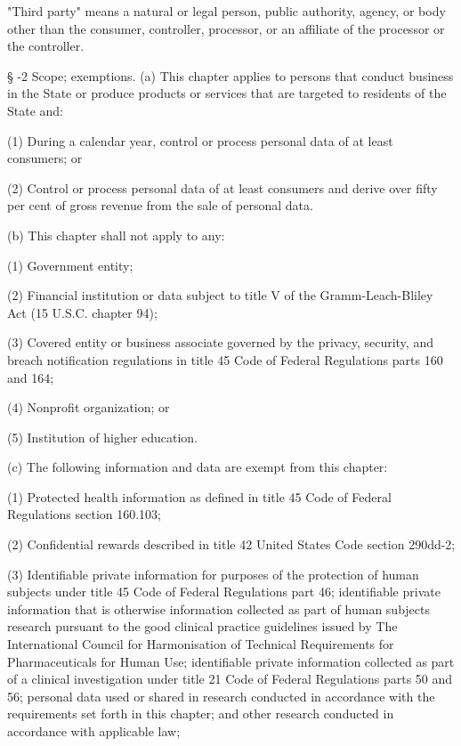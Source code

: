      "Third party" means a natural or legal person, public authority, agency, or body other than the consumer, controller, processor, or an affiliate of the processor or the controller.

     §   -2  Scope; exemptions.  (a)  This chapter applies to persons that conduct business in the State or produce products or services that are targeted to residents of the State and:

     (1)  During a calendar year, control or process personal data of at least               consumers; or

     (2)  Control or process personal data of at least               consumers and derive over fifty per cent of gross revenue from the sale of personal data.

     (b)  This chapter shall not apply to any:

     (1)  Government entity;

     (2)  Financial institution or data subject to title V of the Gramm-Leach-Bliley Act (15 U.S.C. chapter 94);

     (3)  Covered entity or business associate governed by the privacy, security, and breach notification regulations in title 45 Code of Federal Regulations parts 160 and 164;

     (4)  Nonprofit organization; or

     (5)  Institution of higher education.

     (c)  The following information and data are exempt from this chapter:

     (1)  Protected health information as defined in title 45 Code of Federal Regulations section 160.103;

     (2)  Confidential rewards described in title 42 United States Code section 290dd-2;

     (3)  Identifiable private information for purposes of the protection of human subjects under title 45 Code of Federal Regulations part 46; identifiable private information that is otherwise information collected as part of human subjects research pursuant to the good clinical practice guidelines issued by The International Council for Harmonisation of Technical Requirements for Pharmaceuticals for Human Use; identifiable private information collected as part of a clinical investigation under title 21 Code of Federal Regulations parts 50 and 56; personal data used or shared in research conducted in accordance with the requirements set forth in this chapter; and other research conducted in accordance with applicable law;

